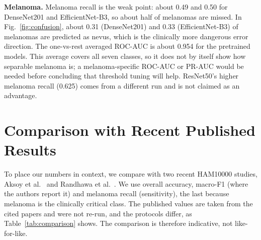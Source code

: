 \documentclass[conference]{IEEEtran}
\begin{document}
\noindent\textbf{Melanoma.} Melanoma recall is the weak point: about 0.49 and 0.50 for DenseNet201 and EfficientNet-B3, so about half of melanomas are missed. In Fig.~\ref{fig:confusion}, about 0.31 (DenseNet201) and 0.33 (EfficientNet-B3) of melanomas are predicted as nevus, which is the clinically more dangerous error direction. The one-vs-rest averaged ROC-AUC is about 0.954 for the pretrained models. This average covers all seven classes, so it does not by itself show how separable melanoma is; a melanoma-specific ROC-AUC or PR-AUC would be needed before concluding that threshold tuning will help. ResNet50's higher melanoma recall (0.625) comes from a different run and is not claimed as an advantage.

\section{Comparison with Recent Published Results}
To place our numbers in context, we compare with two recent HAM10000 studies, Aksoy et al.~\cite{aksoy2025} and Randhawa et al.~\cite{randhawa2026}. We use overall accuracy, macro-F1 (where the authors report it) and melanoma recall (sensitivity), the last because melanoma is the clinically critical class. The published values are taken from the cited papers and were not re-run, and the protocols differ, as Table~\ref{tab:comparison} shows. The comparison is therefore indicative, not like-for-like.
\end{document}
